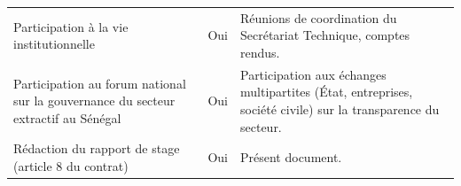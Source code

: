 \documentclass[12pt, a4paper]{article}
\newcommand{\nozebre}{\rowcolors{1}{}{}}
\begin{document}
\begin{small}
\begin{singlespace}
\begin{longtable}{p{5.2cm}p{2.1cm}p{6.6cm}}
  Participation à la vie institutionnelle & Oui & Réunions de coordination du Secrétariat Technique, comptes rendus.\\
  Participation au forum national sur la gouvernance du secteur extractif au Sénégal & Oui & Participation aux échanges multipartites (État, entreprises, société civile) sur la transparence du secteur.\\
  Rédaction du rapport de stage (article 8 du contrat) & Oui & Présent document.\\
\end{longtable}
\nozebre
\end{singlespace}
\end{small}
\end{document}

